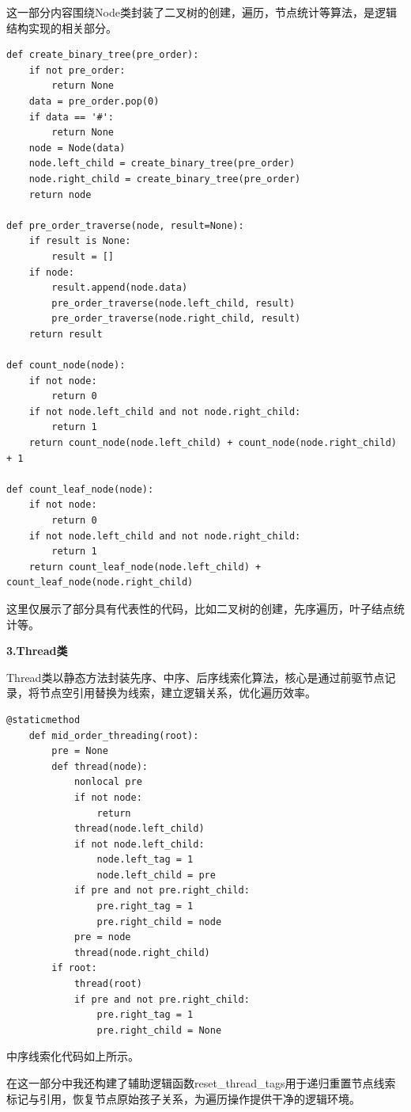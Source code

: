 \documentclass[12pt,a4paper]{article}
\begin{document}
这一部分内容围绕Node类封装了二叉树的创建，遍历，节点统计等算法，是逻辑结构实现的相关部分。

\begin{verbatim}
def create_binary_tree(pre_order):
    if not pre_order:
        return None
    data = pre_order.pop(0)
    if data == '#':
        return None
    node = Node(data)
    node.left_child = create_binary_tree(pre_order)
    node.right_child = create_binary_tree(pre_order)
    return node

def pre_order_traverse(node, result=None):
    if result is None:
        result = []
    if node:
        result.append(node.data)
        pre_order_traverse(node.left_child, result)
        pre_order_traverse(node.right_child, result)
    return result

def count_node(node):
    if not node:
        return 0
    if not node.left_child and not node.right_child:
        return 1
    return count_node(node.left_child) + count_node(node.right_child) + 1

def count_leaf_node(node):
    if not node:
        return 0
    if not node.left_child and not node.right_child:
        return 1
    return count_leaf_node(node.left_child) + count_leaf_node(node.right_child)
\end{verbatim}

这里仅展示了部分具有代表性的代码，比如二叉树的创建，先序遍历，叶子结点统计等。

\noindent\textbf {3.Thread类}

Thread类以静态方法封装先序、中序、后序线索化算法，核心是通过前驱节点记录，将节点空引用替换为线索，建立逻辑关系，优化遍历效率。

\begin{verbatim}
@staticmethod
    def mid_order_threading(root):
        pre = None
        def thread(node):
            nonlocal pre
            if not node:
                return
            thread(node.left_child)
            if not node.left_child:
                node.left_tag = 1
                node.left_child = pre
            if pre and not pre.right_child:
                pre.right_tag = 1
                pre.right_child = node
            pre = node
            thread(node.right_child)
        if root:
            thread(root)
            if pre and not pre.right_child:
                pre.right_tag = 1
                pre.right_child = None
\end{verbatim}

中序线索化代码如上所示。

在这一部分中我还构建了辅助逻辑函数reset\_thread\_tags用于递归重置节点线索标记与引用，恢复节点原始孩子关系，为遍历操作提供干净的逻辑环境。
\end{document}
